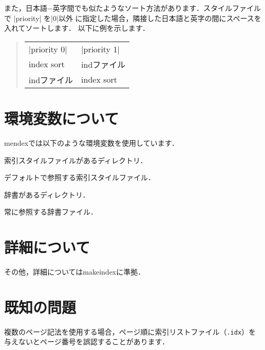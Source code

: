 \documentclass[a4paper]{jsarticle}
\newcommand{\SoftName}[1]{\textsf{#1}}
\newcommand{\FileExtension}[1]{\texttt{.#1}}
\begin{document}
また，日本語−英字間でも似たようなソート方法があります．スタイルファイルで |priority| を|0|以外
に指定した場合，隣接した日本語と英字の間にスペースを入れてソートします． 以下に例を示します．
%
\begin{quote}
\begin{tabular}{ll}
|priority 0| & |priority 1| \\
index sort & indファイル \\
indファイル & index sort
\end{tabular}
\end{quote}

\section{環境変数について}

\SoftName{mendex}では以下のような環境変数を使用しています．

\begin{description}[leftmargin=5cm]
\item[|INDEXSTYLE|]
索引スタイルファイルがあるディレクトリ．

\item[|INDEXDEFAULTSTYLE|]
デフォルトで参照する索引スタイルファイル．

\item[|INDEXDICTIONARY|]
辞書があるディレクトリ．

\item[|INDEXDEFAULTDICTIONARY|]
常に参照する辞書ファイル．
\end{description}

\section{詳細について}
その他，詳細については\SoftName{makeindex}に準拠．

\section{既知の問題}
複数のページ記法を使用する場合，ページ順に索引リストファイル（\FileExtension{idx}）を
与えないとページ番号を誤認することがあります．
\end{document}
